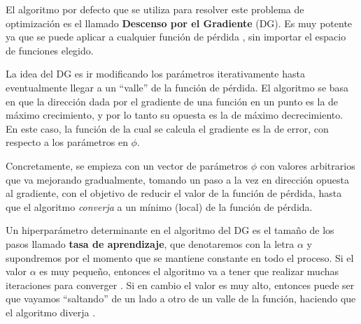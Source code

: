 \documentclass[../../main.tex]{subfiles}
\begin{document}
El algoritmo por defecto que se utiliza para resolver este problema de optimización es el llamado \textbf{Descenso por el Gradiente} (DG). Es muy potente ya que se puede aplicar a cualquier función de pérdida \cite{ai-a-modern-approach}, sin importar el espacio de funciones elegido.

La idea del DG es ir modificando los parámetros iterativamente hasta eventualmente llegar a un ``valle'' de la función de pérdida. El algoritmo se basa en que la dirección dada por el gradiente\footnotemark{} de una función en un punto es la de máximo crecimiento, y por lo tanto su opuesta es la de máximo decrecimiento. En este caso, la función de la cual se calcula el gradiente es la de error, con respecto a los parámetros en \(\phi\).

Concretamente, se empieza con un vector de parámetros \(\phi\) con valores arbitrarios que va mejorando gradualmente, tomando un paso a la vez en dirección opuesta al gradiente, con el objetivo de reducir el valor de la función de pérdida, hasta que el algoritmo \textit{converja} a un mínimo (local) de la función de pérdida.

Un hiperparámetro\footnotemark{} determinante en el algoritmo del DG es el tamaño de los pasos llamado \textbf{tasa de aprendizaje}, que denotaremos con la letra \(\alpha\) y supondremos por el momento que se mantiene constante en todo el proceso. Si el valor \(\alpha\) es muy pequeño, entonces el algoritmo va a tener que realizar muchas iteraciones para converger \cite{hands-on-ML-sklearn-tf}. Si en cambio el valor es muy alto, entonces puede ser que vayamos ``saltando'' de un lado a otro de un valle de la función, haciendo que el algoritmo diverja \cite{hands-on-ML-sklearn-tf}.
\end{document}
